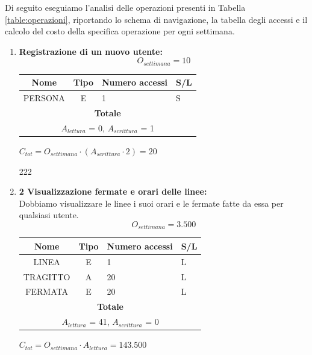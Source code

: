 \documentclass[12pt,a4paper]{report}
\begin{document}
\noindent Di seguito eseguiamo l'analisi delle operazioni presenti in Tabella \ref{table:operazioni}, riportando lo schema di navigazione, la tabella degli accessi e il calcolo del costo della specifica operazione per ogni settimana.
\begin{enumerate}[label=\textbf{\arabic*)}]

    \item \textbf{Registrazione di un nuovo utente:} \\
    \[ {O_{settimana} = 10} \]
    \begin{table}[H]
    \centering
    \begin{tabular}{|c|c|l|l|}
    \hline
    \textbf{Nome} & \textbf{Tipo} & \textbf{Numero accessi} & \textbf{S/L} \\
    \hline
    PERSONA & E & 1 & S \\
    \hline
    \multicolumn{4}{c}{\textbf{Totale}} \\    
    \multicolumn{4}{c}{${A_{lettura}}$ = 0, ${A_{scrittura}}$ = 1} \\
    \hline
    \end{tabular}
    \end{table}
    \begin{center}
    ${C_{tot} = {O_{settimana}}\cdot({A_{scrittura}}\cdot 2)= 20}$
    \end{center}

    222
    \item \textbf{2 Visualizzazione fermate e orari delle linee:} \\
        Dobbiamo visualizzare le linee i suoi orari e le fermate fatte da essa per qualsiasi utente.
        \[ {O_{settimana} = 3.500} \]
        \begin{table}[H]
        \centering
        \begin{tabular}{|c|c|l|l|}
        \hline
        \textbf{Nome} & \textbf{Tipo} & \textbf{Numero accessi} & \textbf{S/L} \\
        \hline
        LINEA & E & 1 & L \\
        \hline
        TRAGITTO & A & 20 & L \\
        \hline
        FERMATA & E & 20 & L \\
        \hline
        
        \hline
        \multicolumn{4}{c}{\textbf{Totale}} \\    
        \multicolumn{4}{c}{${A_{lettura}}$ = 41, ${A_{scrittura}}$ = 0} \\
        \hline
        \end{tabular}
        \end{table}
        \begin{center}
        ${C_{tot} = {O_{settimana}}\cdot{A_{lettura}} = 143.500}$
        \end{center}


\end{enumerate}
\end{document}
